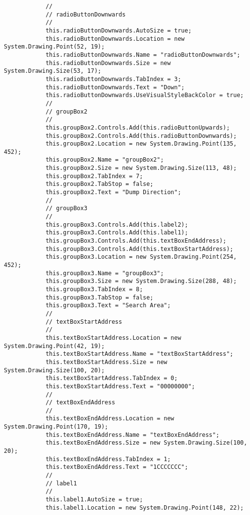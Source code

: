 \begin{lstlisting}
            // 
            // radioButtonDownwards
            // 
            this.radioButtonDownwards.AutoSize = true;
            this.radioButtonDownwards.Location = new System.Drawing.Point(52, 19);
            this.radioButtonDownwards.Name = "radioButtonDownwards";
            this.radioButtonDownwards.Size = new System.Drawing.Size(53, 17);
            this.radioButtonDownwards.TabIndex = 3;
            this.radioButtonDownwards.Text = "Down";
            this.radioButtonDownwards.UseVisualStyleBackColor = true;
            // 
            // groupBox2
            // 
            this.groupBox2.Controls.Add(this.radioButtonUpwards);
            this.groupBox2.Controls.Add(this.radioButtonDownwards);
            this.groupBox2.Location = new System.Drawing.Point(135, 452);
            this.groupBox2.Name = "groupBox2";
            this.groupBox2.Size = new System.Drawing.Size(113, 48);
            this.groupBox2.TabIndex = 7;
            this.groupBox2.TabStop = false;
            this.groupBox2.Text = "Dump Direction";
            // 
            // groupBox3
            // 
            this.groupBox3.Controls.Add(this.label2);
            this.groupBox3.Controls.Add(this.label1);
            this.groupBox3.Controls.Add(this.textBoxEndAddress);
            this.groupBox3.Controls.Add(this.textBoxStartAddress);
            this.groupBox3.Location = new System.Drawing.Point(254, 452);
            this.groupBox3.Name = "groupBox3";
            this.groupBox3.Size = new System.Drawing.Size(288, 48);
            this.groupBox3.TabIndex = 8;
            this.groupBox3.TabStop = false;
            this.groupBox3.Text = "Search Area";
            // 
            // textBoxStartAddress
            // 
            this.textBoxStartAddress.Location = new System.Drawing.Point(42, 19);
            this.textBoxStartAddress.Name = "textBoxStartAddress";
            this.textBoxStartAddress.Size = new System.Drawing.Size(100, 20);
            this.textBoxStartAddress.TabIndex = 0;
            this.textBoxStartAddress.Text = "00000000";
            // 
            // textBoxEndAddress
            // 
            this.textBoxEndAddress.Location = new System.Drawing.Point(170, 19);
            this.textBoxEndAddress.Name = "textBoxEndAddress";
            this.textBoxEndAddress.Size = new System.Drawing.Size(100, 20);
            this.textBoxEndAddress.TabIndex = 1;
            this.textBoxEndAddress.Text = "1CCCCCCC";
            // 
            // label1
            // 
            this.label1.AutoSize = true;
            this.label1.Location = new System.Drawing.Point(148, 22);

\end{lstlisting}
